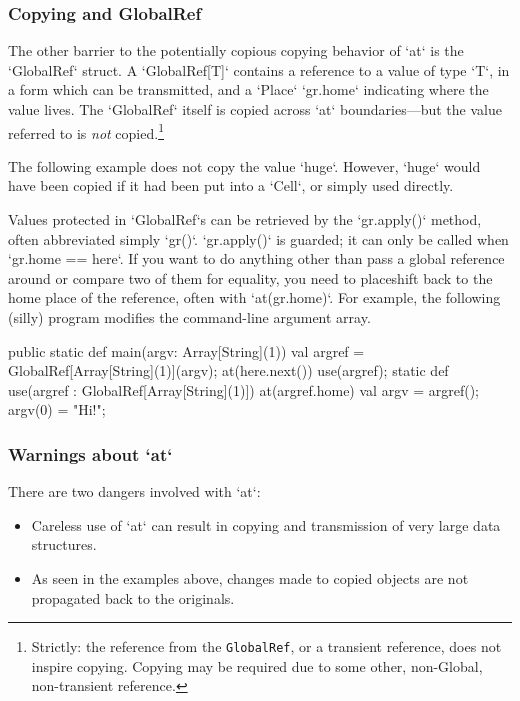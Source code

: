 \subsubsection{Copying and GlobalRef}

The other barrier to the potentially copious copying behavior of \xcd`at`
is the \xcd`GlobalRef` struct.  A \xcd`GlobalRef[T]` contains a reference to
a value of type \xcd`T`, in a form which can be transmitted, and a \xcd`Place`
\xcd`gr.home` indicating where the value lives.
The \xcd`GlobalRef` itself is copied across
\xcd`at` boundaries---but the value referred to is {\em not}
copied.\footnote{Strictly: the reference from the {\tt GlobalRef}, or a
transient reference, does not
inspire copying.  Copying may be required due to some other, non-Global,
non-transient 
reference.} 

The following example does not copy the value \xcd`huge`.  However, \xcd`huge`
would have been copied if it had been put into a \xcd`Cell`, or simply used
directly. 
\begin{xten}
val huge = "A potentially big thing";
val href = GlobalRef(huge);
at (here) {
   use(href);
  }
}
\end{xten}


Values protected in \xcd`GlobalRef`s can be retrieved by the \xcd`gr.apply()`
method, often abbreviated simply \xcd`gr()`.  \xcd`gr.apply()` is guarded; it can
only be called when \xcd`gr.home == here`.  If you  want to do anything other
than pass a global reference around or compare two of them for equality, you
need to placeshift back to the home place of the reference, often with
\xcd`at(gr.home)`.   For example, the following (silly) program modifies the
command-line argument array.

\begin{xten}
  public static def main(argv: Array[String](1)) {
    val argref = GlobalRef[Array[String](1)](argv);
    at(here.next()) use(argref);
  }
  static def use(argref : GlobalRef[Array[String](1)]) {
    at(argref.home) {
      val argv = argref();
      argv(0) = "Hi!";
    }
  }
\end{xten}





\subsubsection{Warnings about \xcd`at`}
There are two dangers involved with \xcd`at`: 
\begin{itemize}
\item Careless use of \xcd`at` can result in copying and transmission
of very large data structures.  
\item As seen in the examples above, changes made to copied objects are not
      propagated back to the originals.   
\end{itemize}

